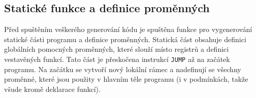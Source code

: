 \documentclass[a4paper, 12pt]{article}
\begin{document}
    \subsection{Statické funkce a definice proměnných}
    Před spuštěním veškerého generování kódu je spuštěna funkce pro vygenerování statické části programu a definice proměnných. Statická část obsahuje definici globálních pomocných proměnných, které slouží místo registrů a definici vestavěných funkcí. Tato část je přeskočena instrukcí \texttt{JUMP} až na začátek programu. Na začátku se vytvoří nový lokální rámec a nadefinují se všechny proměnné, které jsou použity v hlavním těle programu (i v podmínkách, takže všude kromě deklarace funkcí).

    \subsection{}

    \newpage
	\renewcommand{\refname}{Zdroje}
	\printbibliography
\end{document}
